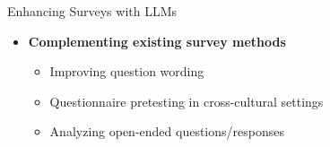 \documentclass[10pt,aspectratio=169]{beamer}
\begin{document}














\begin{frame}{Enhancing Surveys with LLMs}
\begin{itemize}
    \item \textbf{Complementing existing survey methods }
    \begin{itemize}
        \item Improving question wording \textcolor{gray}{\citep{wang2024autosurvey}}  
        \item Questionnaire pretesting in cross-cultural settings \textcolor{gray}{\citep{adhikari2025exploring}}
        \item Analyzing open-ended questions/responses \textcolor{gray}{\citep{mellon2024ais}}
    \end{itemize} 
\end{itemize}
\end{frame}
\end{document}
